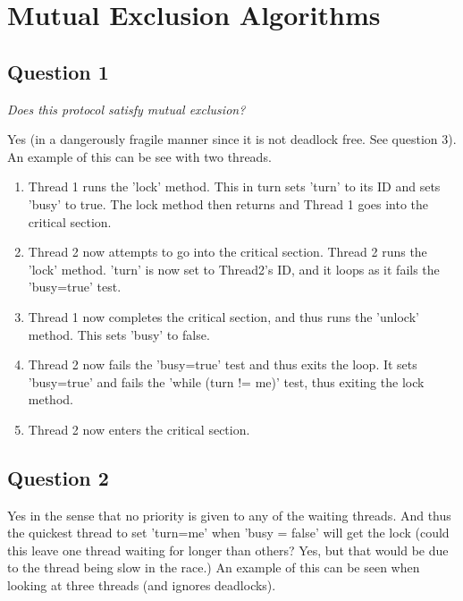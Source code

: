 \section{Mutual Exclusion Algorithms}

\subsection{Question 1}

\begin{center}
    \textit{Does this protocol satisfy mutual exclusion?}
\end{center}

Yes (in a dangerously fragile manner since it is not deadlock free. See question 
3). An example of this can be see with two threads.

\begin{enumerate}
    \item Thread 1 runs the 'lock' method. This in turn sets 'turn' to its ID 
    and sets 'busy' to true. The lock method then returns and Thread 1 goes into 
    the critical section.
    \item Thread 2 now attempts to go into the critical section. Thread 2 runs 
    the 'lock' method. 'turn' is now set to Thread2's ID, and it loops as it 
    fails the 'busy=true' test.
    \item Thread 1 now completes the critical section, and thus runs the 'unlock'
    method. This sets 'busy' to false.
    \item Thread 2 now fails the 'busy=true' test and thus exits the loop. 
    It sets 'busy=true' and fails the 'while (turn != me)' test, thus exiting 
    the lock method.
    \item Thread 2 now enters the critical section.
\end{enumerate}

\subsection{Question 2}

Yes in the sense that no priority is given to any of the waiting threads. 
And thus the quickest thread to set 'turn=me' when 'busy = false' will get the 
lock (could this leave one thread waiting for longer than others? Yes, but that 
would be due to the thread being slow in the race.) An example of this can be 
seen when looking at three threads (and ignores deadlocks).

